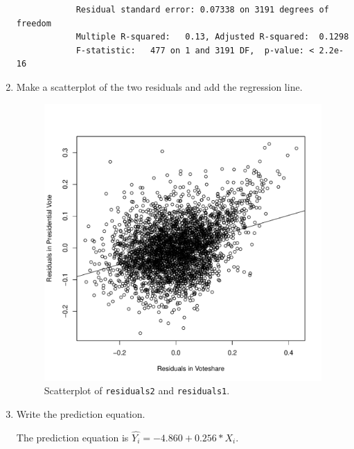 \documentclass[12pt,letterpaper]{article}
\begin{document}
\begin{enumerate}
\begin{footnotesize}
\begin{verbatim}
			Residual standard error: 0.07338 on 3191 degrees of freedom
			Multiple R-squared:   0.13,	Adjusted R-squared:  0.1298 
			F-statistic:   477 on 1 and 3191 DF,  p-value: < 2.2e-16
			\end{verbatim}
		\end{footnotesize}
		\item Make a scatterplot of the two residuals and add the regression line. 
		\begin{figure}[h!]\centering
			\caption{\footnotesize Scatterplot of \texttt{residuals2} and \texttt{residuals1}.
			}\vspace{-1cm}
			\label{fig:plot4}
			\includegraphics[width=.75\textwidth]{plot4.pdf}
		\end{figure}
		\vspace{.25cm}
		\item Write the prediction equation.
		
		The prediction equation is $\hat{Y_{i}}=-4.860+0.256*X_i$.\\
	\end{enumerate}
	
	\newpage	
\end{document}
